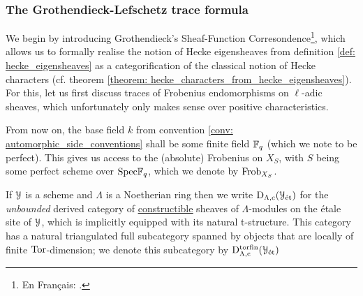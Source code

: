         \subsubsection{The Grothendieck-Lefschetz trace formula}
            We begin by introducing Grothendieck's Sheaf-Function Corresondence\footnote{En Français: .}, which allows us to formally realise the notion of Hecke eigensheaves from definition \ref{def: hecke_eigensheaves} as a categorification of the classical notion of Hecke characters (cf. theorem \ref{theorem: hecke_characters_from_hecke_eigensheaves}). For this, let us first discuss traces of Frobenius endomorphisms on $\ell$-adic sheaves, which unfortunately only makes sense over positive characteristics.
            \begin{convention} \label{conv: frobenii}
                From now on, the base field $k$ from convention \ref{conv: automorphic_side_conventions} shall be some finite field $\mathbb{F}_q$ (which we note to be perfect). This gives us access to the (absolute) Frobenius on $X_S$, with $S$ being some perfect scheme over $\mathrm{Spec} \mathbb{F}_q$, which we denote by $\mathrm{Frob}_{X_S}$.
            \end{convention}
            \begin{convention} \label{conv: derived_categories_of_constructible_sheaves}
                If $\mathcal{Y}$ is a scheme and $\Lambda$ is a Noetherian ring then we write $\mathrm{D}_{\Lambda, \mathrm{c}}(\mathcal{Y}_{\mathrm{\acute{e}t}})$ for the \textit{unbounded} derived category of \href{https://stacks.math.columbia.edu/tag/03RW}{\underline{constructible}} sheaves of $\Lambda$-modules on the \'etale site of $\mathcal{Y}$, which is implicitly equipped with its natural t-structure. This category has a natural triangulated full subcategory spanned by objects that are locally of finite $\mathrm{Tor}$-dimension; we denote this subcategory by $\mathrm{D}_{\Lambda, \mathrm{c}}^{\mathrm{tor}\mathrm{fin}}(\mathcal{Y}_{\mathrm{\acute{e}t}})$
            \end{convention}
            \begin{remark} \label{remark: tor_finiteness_for_constructible_sheaves}
                
            \end{remark}
